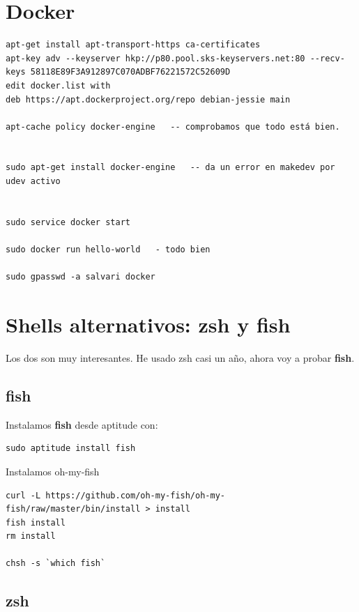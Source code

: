 \documentclass[12pt,spanish,]{article}
\begin{document}
\section{Docker}\label{docker}

\begin{verbatim}
apt-get install apt-transport-https ca-certificates
apt-key adv --keyserver hkp://p80.pool.sks-keyservers.net:80 --recv-keys 58118E89F3A912897C070ADBF76221572C52609D
edit docker.list with
deb https://apt.dockerproject.org/repo debian-jessie main

apt-cache policy docker-engine   -- comprobamos que todo está bien.


sudo apt-get install docker-engine   -- da un error en makedev por udev activo


sudo service docker start

sudo docker run hello-world   - todo bien

sudo gpasswd -a salvari docker
\end{verbatim}

\section{Shells alternativos: zsh y
fish}\label{shells-alternativos-zsh-y-fish}

Los dos son muy interesantes. He usado zsh casi un año, ahora voy a
probar \textbf{fish}.

\subsection{fish}\label{fish}

Instalamos \textbf{fish} desde aptitude con:

\begin{verbatim}
sudo aptitude install fish
\end{verbatim}

Instalamos oh-my-fish

\begin{verbatim}
curl -L https://github.com/oh-my-fish/oh-my-fish/raw/master/bin/install > install
fish install
rm install

chsh -s `which fish`
\end{verbatim}

\subsection{zsh}\label{zsh}
\end{document}
